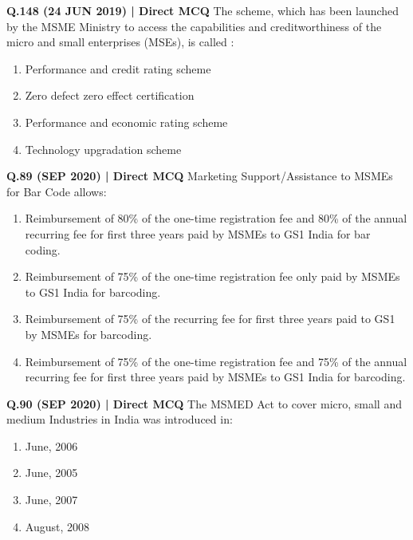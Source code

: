 \documentclass{article}
\begin{document}
\textbf{Q.148 (24 JUN 2019) | Direct MCQ}
The scheme, which has been launched by the MSME Ministry to access the capabilities and creditworthiness of the micro and small enterprises (MSEs), is called :
\begin{enumerate}[label=(\arabic*)]
    \item Performance and credit rating scheme
    \item Zero defect zero effect certification
    \item Performance and economic rating scheme
    \item Technology upgradation scheme
\end{enumerate}

\textbf{Q.89 (SEP 2020) | Direct MCQ}
Marketing Support/Assistance to MSMEs for Bar Code allows:
\begin{enumerate}[label=(\arabic*)]
    \item Reimbursement of 80\% of the one-time registration fee and 80\% of the annual recurring fee for first three years paid by MSMEs to GS1 India for bar coding.
    \item Reimbursement of 75\% of the one-time registration fee only paid by MSMEs to GS1 India for barcoding.
    \item Reimbursement of 75\% of the recurring fee for first three years paid to GS1 by MSMEs for barcoding.
    \item Reimbursement of 75\% of the one-time registration fee and 75\% of the annual recurring fee for first three years paid by MSMEs to GS1 India for barcoding.
\end{enumerate}

\textbf{Q.90 (SEP 2020) | Direct MCQ}
The MSMED Act to cover micro, small and medium Industries in India was introduced in:
\begin{enumerate}[label=(\arabic*)]
    \item June, 2006
    \item June, 2005
    \item June, 2007
    \item August, 2008
\end{enumerate}
\end{document}
